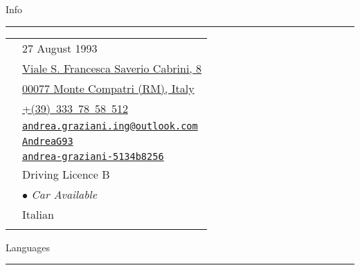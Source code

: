 \documentclass[english,10pt,a4paper]{article}
\newcommand{\CvBulletForSidebar}{\hspace{0.05cm}\textcolor{CvColor}{$\bullet$}\hspace{0.05cm}
	}
\newcommand{\CvSidebarSection}[2]{
	\textcolor{CvColor!50}{{\footnotesize #1}} \hspace{0.01cm} \textcolor{CvColor!80}{{\footnotesize #2}} \\
	\textcolor{CvColor}{\rule[.7\baselineskip]{0.8\textwidth}{1pt}}}
\begin{document}
\begin{paracol}{2}
\begin{tcolorbox}[colback=CvSidebarBackColor,height=\textheight,boxrule=0pt, left=0pt,right=0pt,top=0pt,bottom=0pt, arc=0pt,outer arc=0pt, colframe=CvSidebarBackColor]
\begin{center}
\begin{quotation}
{	}
\end{quotation}

\CvSidebarSection{\faInfoCircle}{Info}

{\scriptsize 	
	\begin{tabular}{cl}
			\textcolor{CvColor}{\faUser[light]} & 27 August 1993 \\[5pt]
		
			\textcolor{CvColor}{\faMapMarker*[light]} & \href{https://www.google.com/maps/place/41.8093516,12.7373629}{Viale S. Francesca Saverio Cabrini, 8} \\
			& \href{https://www.google.com/maps/place/41.8093516,12.7373629}{00077 Monte Compatri (RM), Italy} \\[5pt]
		
			\textcolor{CvColor}{\faPhone*[light]} & \textcolor{CvSidebarTextColor}{\href{tel:393337858512}{+(39)~333~78~58~512}} \\[5pt]
			
			\textcolor{CvColor}{\faEnvelope[light]} &  \href{mailto:andrea.graziani.ing@outlook.com}{\textcolor{CvSidebarTextColor}{\texttt{andrea.graziani.ing@outlook.com}}} \\[5pt]
			
			\textcolor{CvColor}{\faGithub} & \href{https://github.com/AndreaG93}{\textcolor{CvSidebarTextColor}{\texttt{AndreaG93}}}\\[5pt]
			
			\textcolor{CvColor}{\faLinkedin} & \href{https://it.linkedin.com/in/andrea-graziani-5134b8256}{\textcolor{CvSidebarTextColor}{\texttt{andrea-graziani-5134b8256}}} \\[5pt]
			
			\textcolor{CvColor}{\faCar[light]} & Driving Licence B \\
			& \CvBulletForSidebar \textit{{\scriptsize Car Available}} \\[5pt]
			
			\textcolor{CvColor}{\faFlag[light]} & Italian \\\\
	\end{tabular}
}

\CvSidebarSection{\faLanguage}{Languages}


\end{center}
\end{tcolorbox}
\end{paracol}
\end{document}
